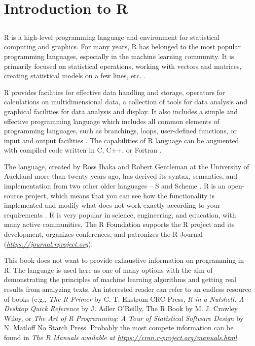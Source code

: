 \chapter{Introduction to R}

\section*{}

R is a high-level programming language and environment for statistical computing and graphics. For many years, R has belonged to the most popular programming languages, especially in the machine learning community. It is primarily
focused on statistical operations, working with vectors and matrices, creating
statistical models on a few lines, etc. \cite{ref209}.

R provides facilities for effective data handling and storage, operators for
calculations on multidimensional data, a collection of tools for data analysis and
graphical facilities for data analysis and display. It also includes a simple and
effective programming language which includes all common elements of programming languages, such as branchings, loops, user-defined functions, or input
and output facilities \cite{ref117}. The capabilities of R language can be augmented with
compiled code written in C, C++, or Fortran \cite{ref80}.

The language, created by Ross Ihaka and Robert Gentleman at the University of Auckland more than twenty years ago, has derived its syntax, semantics,
and implementation from two other older languages – S and Scheme \cite{ref125}. R
is an open-source project, which means that you can see how the functionality
is implemented and modify what does not work exactly according to your requirements \cite{ref203}. R is very popular in science, engineering, and education, with
many active communities. The R Foundation supports the R project and its development, organizes conferences, and patronizes the R Journal (\textit{\href{https://journal.r-project.org/}{https://journal.rproject.org}}).

This book does not want to provide exhaustive information on programming
in R. The language is used here as one of many options with the aim of demonstrating the principles of machine learning algorithms and getting real results
from analyzing texts. An interested reader can refer to an endless resource of
books (e.g., \textit{The R Primer} by C. T. Ekstrom {CRC Press}, \textit{R in a Nutshell: A Desktop Quick Reference} by J. Adler {O’Reilly}, The R Book by M. J. Crawley
{Wiley}, or \textit{The Art of R Programming: A Tour of Statistical Software Design}
by N. Matloff {No Starch Press}. Probably the most compete information can be
found in \textit{The R Manuals available at \href{https://cran.r-project.org/}{https://cran.r-project.org/manuals.html}}.

